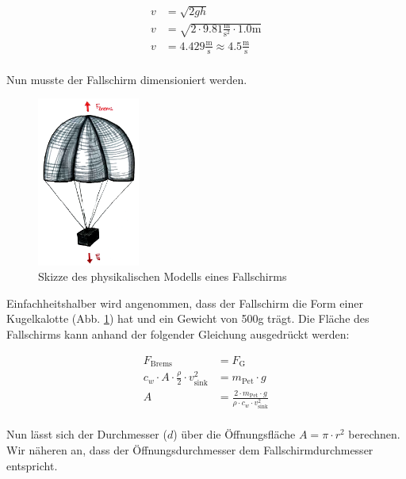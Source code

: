 \begin{equation}
\label{eq:pet}
\begin{split}
v &= \sqrt{2gh} \\
v &= \sqrt{2 \cdot 9.81\frac{\text{m}}{\text{s}^2} \cdot 1.0\text{m}} \\
v &= 4.429 \frac{\text{m}}{\text{s}} \approx 4.5 \frac{\text{m}}{\text{s}} \\
\end{split}
\end{equation}

Nun musste der Fallschirm dimensioniert werden.
\begin{figure}[H]
	\centering
	\includegraphics[width=0.3\textwidth] {images/fallschirm_berechnung.png}
	\caption{Skizze des physikalischen Modells eines Fallschirms}
	\label{fig:fallschirm-berechnung}
\end{figure}
Einfachheitshalber wird angenommen, dass der Fallschirm die Form einer Kugelkalotte (Abb. \ref{fig:fallschirm-berechnung}) hat und ein Gewicht von 500g trägt. Die Fläche des Fallschirms kann anhand der folgender Gleichung ausgedrückt werden:


\begin{equation}
\begin{split}
F_{\text{Brems}} &= F_{\text{G}} \\
c_{w} \cdot A \cdot \frac{\rho}{2} \cdot v_{\text{sink}}^{2} &= m_{\text{Pet}} \cdot g \\
A &= \frac{2 \cdot m_{\text{Pet}} \cdot g}{\rho \cdot c_{w} \cdot v_{\text{sink}}^{2} } \\
\end{split}
\end{equation}

Nun lässt sich der Durchmesser ($d$) über die Öffnungsfläche $A = \pi \cdot r^2$ berechnen. Wir näheren an, dass der Öffnungsdurchmesser dem Fallschirmdurchmesser entspricht.

